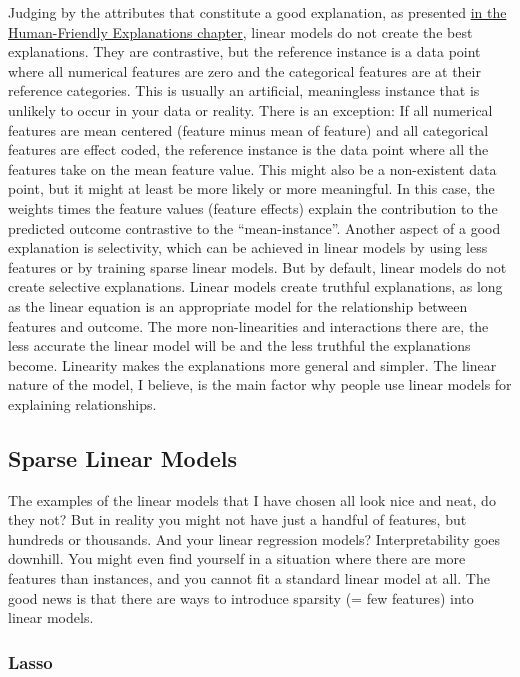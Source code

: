\documentclass[
  12pt,
]{krantz}
\begin{document}
Judging by the attributes that constitute a good explanation, as presented \protect\hyperlink{good-explanation}{in the Human-Friendly Explanations chapter}, linear models do not create the best explanations.
They are contrastive, but the reference instance is a data point where all numerical features are zero and the categorical features are at their reference categories.
This is usually an artificial, meaningless instance that is unlikely to occur in your data or reality.
There is an exception:
If all numerical features are mean centered (feature minus mean of feature) and all categorical features are effect coded, the reference instance is the data point where all the features take on the mean feature value.
This might also be a non-existent data point, but it might at least be more likely or more meaningful.
In this case, the weights times the feature values (feature effects) explain the contribution to the predicted outcome contrastive to the ``mean-instance''.
Another aspect of a good explanation is selectivity, which can be achieved in linear models by using less features or by training sparse linear models.
But by default, linear models do not create selective explanations.
Linear models create truthful explanations, as long as the linear equation is an appropriate model for the relationship between features and outcome.
The more non-linearities and interactions there are, the less accurate the linear model will be and the less truthful the explanations become.
Linearity makes the explanations more general and simpler.
The linear nature of the model, I believe, is the main factor why people use linear models for explaining relationships.

\hypertarget{sparse-linear}{%
\subsection{Sparse Linear Models}\label{sparse-linear}}

The examples of the linear models that I have chosen all look nice and neat, do they not?
But in reality you might not have just a handful of features, but hundreds or thousands.
And your linear regression models?
Interpretability goes downhill.
You might even find yourself in a situation where there are more features than instances, and you cannot fit a standard linear model at all.
The good news is that there are ways to introduce sparsity (= few features) into linear models.

\hypertarget{lasso}{%
\subsubsection{Lasso}\label{lasso}}
\end{document}
